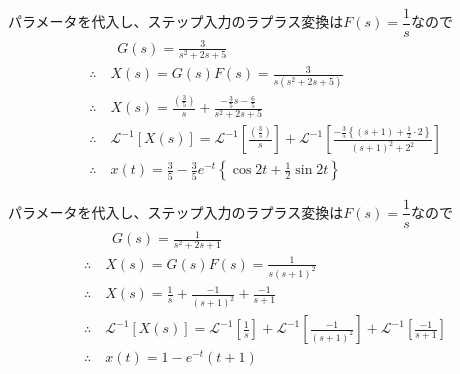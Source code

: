 \documentclass[a4paper,12pt]{article}
\begin{document}
\begin{tcolorbox}[title={4. (3)\(m=1,d=2,k_1=3,k_2=2\)とし、ステップ応答を求めよ。 
    }]
    パラメータを代入し、ステップ入力のラプラス変換は\(F(s)=\dfrac{1}{s}\)なので
    \vspace{-4mm}
    \begin{align*}
        &\qquad G(s) = \frac{3}{s^2 + 2s + 5 } \\
        &\therefore \quad X(s) = G(s) F(s) 
        = \frac{3}{s(s^2 + 2s + 5)} \\
        &\therefore \quad X(s) = \frac{\left(\frac{3}{5}\right)}{s}
        +\frac{-\frac{3}{5}s-\frac{6}{5}}{s^2 + 2s + 5} \\
        &\therefore \quad \mathcal{L}^{-1} \left[ X(s)\right] 
        = \mathcal{L}^{-1} \left[\frac{\left(\frac{3}{5}\right)}{s}\right] 
        + \mathcal{L}^{-1} \left[\frac{-\frac{3}{5}\left\{(s+1)+\frac{1}{2}\cdot 2\right\}}{\left(s+1\right)^2+2^2} \right] \\
        &\therefore \quad x(t) = \frac{3}{5} -\frac{3}{5} e^{-t} \left\{ \cos 2t + \frac{1}{2} \sin 2t\right\}
    \end{align*}

\end{tcolorbox}

\begin{tcolorbox}[title={4. (4)\(m=1,d=2,k_1=1,k_2=0\)とし、ステップ応答を求めよ。 
    }]
    パラメータを代入し、ステップ入力のラプラス変換は\(F(s)=\dfrac{1}{s}\)なので
    \vspace{-4mm}
    \begin{align*}
        &\qquad G(s) = \frac{1}{s^2 + 2s + 1} \\
        &\therefore \quad X(s) = G(s) F(s) = \frac{1}{s(s+1)^2} \\
        &\therefore \quad X(s) = \frac{1}{s}+\frac{-1}{(s+1)^2}+\frac{-1}{s+1} \\
        &\therefore \quad \mathcal{L}^{-1} \left[ X(s)\right] 
        = \mathcal{L}^{-1} \left[\frac{1}{s}\right] 
        + \mathcal{L}^{-1} \left[\frac{-1}{(s+1)^2} \right]
        + \mathcal{L}^{-1} \left[\frac{-1}{s+1} \right] \\
        &\therefore \quad x(t) = 1 - e^{-t}(t+1)
    \end{align*}

\end{tcolorbox}
\end{document}

